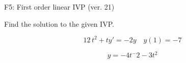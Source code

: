 \begin{exercise}
  \begin{exerciseTitle}F5: First order linear IVP (ver. 21)\end{exerciseTitle}
  \begin{exerciseStatement}
    
Find the solution to the given IVP.

    
\[12 \, t^{2} +ty'= -2 y \hspace{1em} y( 1 ) = -7\]

  \end{exerciseStatement}
  \begin{exerciseAnswer}
    
\[y= -4 t^ -2 -3 t^{2}\]

  \end{exerciseAnswer}
\end{exercise}